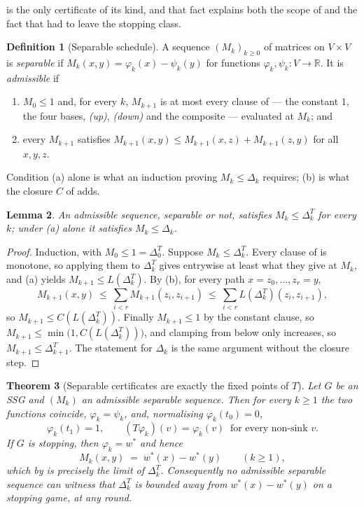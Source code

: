 \documentclass[11pt]{article}
\theoremstyle{plain}
\newtheorem{theorem}{Theorem}[section]
\newtheorem{lemma}[theorem]{Lemma}
\theoremstyle{definition}
\newtheorem{definition}[theorem]{Definition}
\begin{document}
 is the only certificate of its kind, and that
fact explains both the scope of  and the fact
that  had to leave the stopping class.

\begin{definition}[Separable schedule]\label{def:separable}
A sequence $(M_k)_{k\ge0}$ of matrices on $V\times V$ is \emph{separable}
if $M_k(x,y)=\varphi_k(x)-\psi_k(y)$ for functions
$\varphi_k,\psi_k\colon V\to\mathbb{R}$. It is \emph{admissible} if
\begin{enumerate}[label=(\alph*),leftmargin=2.2em]
\item $M_0\le1$ and, for every $k$, $M_{k+1}$ is at most every clause of
       --- the constant $1$, the four bases, \emph{(up)},
      \emph{(down)} and the composite --- evaluated at $M_k$; and
\item every $M_{k+1}$ satisfies
      $M_{k+1}(x,y)\le M_{k+1}(x,z)+M_{k+1}(z,y)$ for all $x,y,z$.
\end{enumerate}
Condition (a) alone is what an induction proving $M_k\le\Delta_k$
requires; (b) is what the closure $C$ of  adds.
\end{definition}

\begin{lemma}\label{lem:separable-lower}
An admissible sequence, separable or not, satisfies
$M_k\le\Delta^{T}_k$ for every $k$; under (a) alone it satisfies
$M_k\le\Delta_k$.
\end{lemma}

\begin{proof}
Induction, with $M_0\le1=\Delta^{T}_0$. Suppose $M_k\le\Delta^{T}_k$.
Every clause of  is monotone, so applying them to
$\Delta^{T}_k$ gives entrywise at least what they give at $M_k$, and (a)
yields $M_{k+1}\le L(\Delta^{T}_k)$. By (b), for every path
$x=z_0,\dots,z_r=y$,
\[
  M_{k+1}(x,y)\ \le\ \sum_{i<r}M_{k+1}(z_i,z_{i+1})
              \ \le\ \sum_{i<r}L(\Delta^{T}_k)(z_i,z_{i+1}),
\]
so $M_{k+1}\le C(L(\Delta^{T}_k))$. Finally $M_{k+1}\le1$ by the constant
clause, so $M_{k+1}\le\min\bigl(1,C(L(\Delta^{T}_k))\bigr)$, and clamping
from below only increases, so $M_{k+1}\le\Delta^{T}_{k+1}$. The statement
for $\Delta_k$ is the same argument without the closure step.
\end{proof}

\begin{theorem}[Separable certificates are exactly the fixed points of
$T$]\label{thm:separable}
Let $G$ be an SSG and $(M_k)$ an admissible separable sequence. Then for
every $k\ge1$ the two functions coincide, $\varphi_k=\psi_k$, and,
normalising $\varphi_k(t_0)=0$,
\[
  \varphi_k(t_1)=1,\qquad
  (T\varphi_k)(v)=\varphi_k(v)\ \text{ for every non-sink }v .
\]
If $G$ is stopping, then $\varphi_k=w^\ast$ and hence
\[
  M_k(x,y)\;=\;w^\ast(x)-w^\ast(y)\qquad(k\ge1),
\]
which by  is precisely the limit of
$\Delta^{T}_k$. Consequently no admissible separable sequence can witness
that $\Delta^{T}_k$ is bounded away from $w^\ast(x)-w^\ast(y)$ on a
stopping game, at any round.
\end{theorem}
\end{document}
